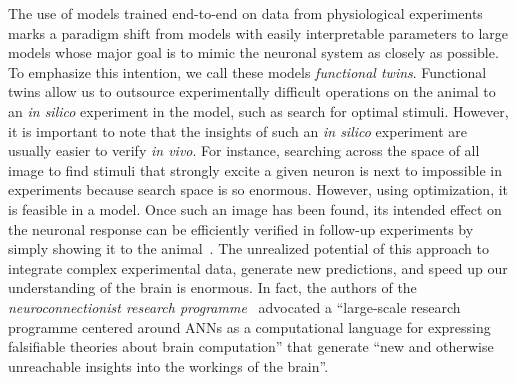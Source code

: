 \documentclass[B2,COG]{ercgrant}
\begin{document}
The use of models trained end-to-end on data from physiological experiments marks a paradigm shift from models with easily interpretable parameters to large models whose major goal is to mimic the neuronal system as closely as possible.
To emphasize this intention, we call these models \textit{functional twins}. 
Functional twins allow us to outsource experimentally difficult operations on the animal to an \textit{in silico} experiment in the model, such as \eg search for optimal stimuli. 
However, it is important to note that the insights of such an \textit{in silico} experiment are usually easier to verify \textit{in vivo}. 
For instance, searching across the space of all image to find stimuli that strongly excite a given neuron is next to impossible in experiments because search space is so enormous.
However, using optimization, it is feasible in a model.
Once such an image has been found, its intended effect on the neuronal response can be efficiently verified in follow-up experiments by simply showing it to the animal~\parencite{Walker2019-yw,Bashivan2019-ry}.
The unrealized potential of this approach to integrate complex experimental data, generate new predictions, and speed up our understanding of the brain is enormous. 
In fact, the authors of the \textit{neuroconnectionist research programme}~\parencite{Doerig2022-ex} advocated a ``large-scale research programme centered around ANNs as a computational language for expressing falsifiable theories about brain computation'' that generate ``new and otherwise unreachable insights into the workings of the brain''. 





\end{document}
